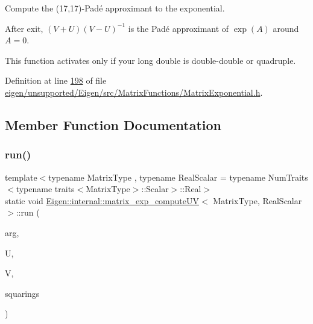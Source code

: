 Compute the (17,17)-\/\+Pad\'{e} approximant to the exponential. 

After exit, $ (V+U)(V-U)^{-1} $ is the Pad\'{e} approximant of $ \exp(A) $ around $ A = 0 $.

This function activates only if your long double is double-\/double or quadruple. 

Definition at line \hyperlink{eigen_2unsupported_2_eigen_2src_2_matrix_functions_2_matrix_exponential_8h_source_l00198}{198} of file \hyperlink{eigen_2unsupported_2_eigen_2src_2_matrix_functions_2_matrix_exponential_8h_source}{eigen/unsupported/\+Eigen/src/\+Matrix\+Functions/\+Matrix\+Exponential.\+h}.



\subsection{Member Function Documentation}
\mbox{\label{struct_eigen_1_1internal_1_1matrix__exp__compute_u_v_a7847531ae0fccc8ec7648f95846c8adb}} 
\subsubsection{\texorpdfstring{run()}{run()}\hspace{0.1cm}{\footnotesize\ttfamily [1/2]}}
{\footnotesize\ttfamily template$<$typename Matrix\+Type , typename Real\+Scalar  = typename Num\+Traits$<$typename traits$<$\+Matrix\+Type$>$\+::\+Scalar$>$\+::\+Real$>$ \\
static void \hyperlink{struct_eigen_1_1internal_1_1matrix__exp__compute_u_v}{Eigen\+::internal\+::matrix\+\_\+exp\+\_\+compute\+UV}$<$ Matrix\+Type, Real\+Scalar $>$\+::run (\begin{DoxyParamCaption}\item[{const Matrix\+Type \&}]{arg,  }\item[{Matrix\+Type \&}]{U,  }\item[{Matrix\+Type \&}]{V,  }\item[{int \&}]{squarings }\end{DoxyParamCaption})\hspace{0.3cm}{\ttfamily [static]}}



